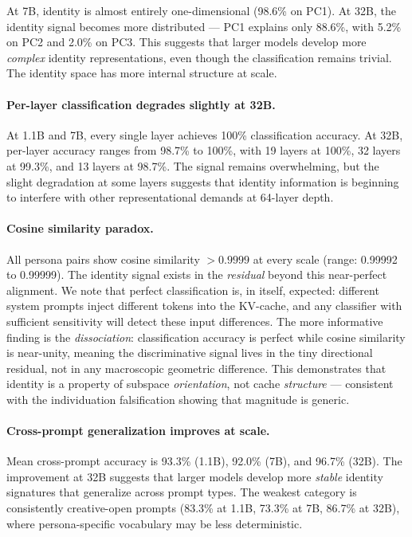 \documentclass[11pt,a4paper]{article}
\begin{document}
At 7B, identity is almost entirely one-dimensional (98.6\% on PC1). At 32B, the identity signal becomes more distributed --- PC1 explains only 88.6\%, with 5.2\% on PC2 and 2.0\% on PC3. This suggests that larger models develop more \emph{complex} identity representations, even though the classification remains trivial. The identity space has more internal structure at scale.

\paragraph{Per-layer classification degrades slightly at 32B.} At 1.1B and 7B, every single layer achieves 100\% classification accuracy. At 32B, per-layer accuracy ranges from 98.7\% to 100\%, with 19 layers at 100\%, 32 layers at 99.3\%, and 13 layers at 98.7\%. The signal remains overwhelming, but the slight degradation at some layers suggests that identity information is beginning to interfere with other representational demands at 64-layer depth.

\paragraph{Cosine similarity paradox.} All persona pairs show cosine similarity $> 0.9999$ at every scale (range: 0.99992 to 0.99999). The identity signal exists in the \emph{residual} beyond this near-perfect alignment. We note that perfect classification is, in itself, expected: different system prompts inject different tokens into the KV-cache, and any classifier with sufficient sensitivity will detect these input differences. The more informative finding is the \emph{dissociation}: classification accuracy is perfect while cosine similarity is near-unity, meaning the discriminative signal lives in the tiny directional residual, not in any macroscopic geometric difference. This demonstrates that identity is a property of subspace \emph{orientation}, not cache \emph{structure} --- consistent with the individuation falsification showing that magnitude is generic.

\paragraph{Cross-prompt generalization improves at scale.} Mean cross-prompt accuracy is 93.3\% (1.1B), 92.0\% (7B), and 96.7\% (32B). The improvement at 32B suggests that larger models develop more \emph{stable} identity signatures that generalize across prompt types. The weakest category is consistently creative-open prompts (83.3\% at 1.1B, 73.3\% at 7B, 86.7\% at 32B), where persona-specific vocabulary may be less deterministic.
\end{document}
